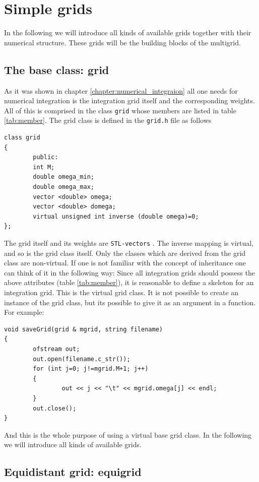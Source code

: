 \chapter{Simple grids} \label{chapter:simple_grids}
In the following we will introduce all kinds of available grids together with their numerical structure. These grids will be the building blocks of the multigrid.
\section{The base class: grid}
As it was shown in chapter \ref{chapter:numerical_integraion} all one needs for numerical integration is the integration grid itself and the corresponding weights. All of this is comprised in the class \texttt{grid} whose members are listed in table \ref{tab:member}. The grid class is defined in the \texttt{grid.h} file as follows

\begin{lstlisting}
class grid
{
        public:
        int M;
        double omega_min;
        double omega_max;
        vector <double> omega;
        vector <double> domega;
        virtual unsigned int inverse (double omega)=0;
};
\end{lstlisting}
The grid itself and its weights are \texttt{STL-vectors} \cite{stl}. The inverse mapping is virtual, and so is the grid class itself. Only the classes which are derived from the grid class are non-virtual. If one is not familiar with the concept of inheritance one can think of it in the following way: Since all integration grids should possess the above attributes (table \ref{tab:member}), it is reasonable to define a skeleton for an integration grid. This is the virtual grid class. It is not possible to create an instance of the grid class, but its possible to give it as an argument in a function. For example:
\begin{lstlisting}
void saveGrid(grid & mgrid, string filename)
{
        ofstream out;
        out.open(filename.c_str());
        for (int j=0; j!=mgrid.M+1; j++)
        {
                out << j << "\t" << mgrid.omega[j] << endl;
        }
        out.close();
}
\end{lstlisting}
And this is the whole purpose of using a virtual base grid class. In the following we will introduce all kinds of available grids.

\section{Equidistant grid: equigrid}\label{sec:equigrid}

